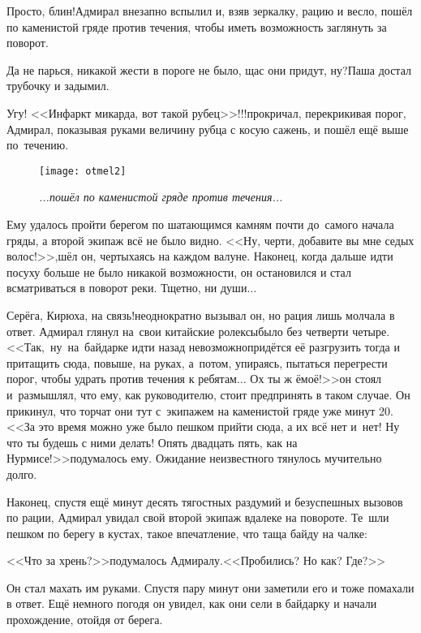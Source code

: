 \diagdash Просто, блин!\mdash Адмирал внезапно вспылил и, взяв зеркалку, рацию и весло, пошёл по каменистой гряде против течения, чтобы иметь возможность заглянуть за поворот.

\diagdash Да не парься, никакой жести в пороге не было, щас они придут, ну?\mdash Паша достал трубочку и задымил.

\diagdash Угу! <<Инфаркт микарда, вот такой рубец>>!!!\mdash прокричал, перекрикивая порог, Адмирал, показывая руками величину рубца с косую сажень, и пошёл ещё выше по~течению.

\begin{figure}[h]
	\centering
	\texttt{[image: otmel2]}
	\caption{\small\textit{...пошёл по каменистой гряде против течения...}}
\end{figure}

Ему удалось пройти берегом по шатающимся камням почти до~самого начала гряды, а второй экипаж всё не было видно. <<Ну, черти, добавите вы мне седых волос!>>,\mdash шёл он, чертыхаясь на каждом валуне. Наконец, когда дальше идти посуху больше не было никакой возможности, он остановился и стал всматриваться в поворот реки. Тщетно, ни души$\ldots$

\diagdash Серёга, Кирюха, на связь!\mdash неоднократно вызывал он, но рация лишь молчала в ответ. Адмирал глянул на~свои китайские ролексы\mdash было без четверти четыре. <<Так,~ну~на~байдарке идти назад невозможно\mdash придётся её разгрузить тогда и притащить сюда, повыше, на руках, а~потом, упираясь, пытаться перегрести порог, чтобы удрать против течения к ребятам$\ldots$ Ох ты ж ё\sdash моё!>>\mdash он стоял и~размышлял, что ему, как руководителю, стоит предпринять в таком случае. Он прикинул, что торчат они тут с~экипажем на каменистой гряде уже минут 20. <<За это время можно уже было пешком прийти сюда, а их всё нет и~нет! Ну что ты будешь с ними делать! Опять двадцать пять, как на Нурмисе!>>\mdash подумалось ему. Ожидание неизвестного тянулось мучительно долго.

Наконец, спустя ещё минут десять тягостных раздумий и безуспешных вызовов по рации, Адмирал увидал свой второй экипаж вдалеке на повороте. Те~шли пешком по берегу в кустах, такое впечатление, что таща байду на чалке: 

<<Что за хрень?>>\mdash подумалось Адмиралу.\mdash <<Пробились? Но как? Где?>>

Он стал махать им руками. Спустя пару минут они заметили его и тоже помахали в ответ. Ещё немного погодя он увидел, как они сели в байдарку и начали прохождение, отойдя от берега.

